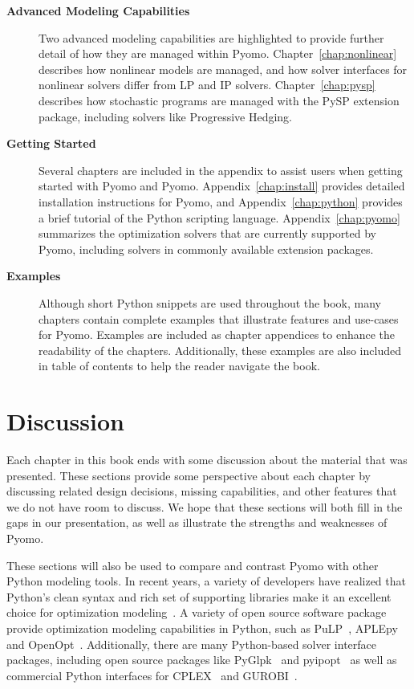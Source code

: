 \begin{description}
\item[{\bf Advanced Modeling Capabilities}] Two advanced modeling
capabilities are highlighted to provide further detail of how they
are managed within Pyomo.  Chapter~\ref{chap:nonlinear} describes how
nonlinear models are managed, and how solver interfaces for nonlinear
solvers differ from LP and IP solvers.  Chapter~\ref{chap:pysp} describes
how stochastic programs are managed with the PySP extension package,
including solvers like Progressive Hedging.

\item[{\bf Getting Started}] Several chapters are included in
the appendix to assist users when getting started with Pyomo and
Pyomo. Appendix~\ref{chap:install} provides detailed installation
instructions for Pyomo, and Appendix~\ref{chap:python} provides a brief
tutorial of the Python scripting language.  Appendix~\ref{chap:pyomo}
summarizes the optimization solvers that are currently supported by Pyomo,
including solvers in commonly available extension packages.

\item[{\bf Examples}] Although short Python snippets are used
throughout the book, many chapters contain complete examples that
illustrate features and use-cases for Pyomo.  Examples are included
as chapter appendices to enhance the readability of the chapters.
Additionally, these examples are also included in table of contents to
help the reader navigate the book.

\end{description}

\section{Discussion}
\label{chap:intro:discussion}

Each chapter in this book ends with some discussion about the material
that was presented.  These sections provide some perspective about each
chapter by discussing related design decisions, missing capabilities,
and other features that we do not have room to discuss.  We hope that these
sections will both fill in the gaps in our presentation, as well as
illustrate the strengths and weaknesses of Pyomo.

These sections will also be used to compare and contrast Pyomo with
other Python modeling tools.  In recent years, a variety of developers
have realized that Python's clean syntax and rich set of supporting
libraries make it an excellent choice for optimization modeling~\cite{hartetal11}.
A variety of open source software package provide optimization modeling
capabilities in Python, such as PuLP~\cite{PuLP}, APLEpy~\cite{APLEpy}
and OpenOpt~\cite{OpenOpt}.  Additionally, there are many Python-based
solver interface packages, including open source packages like
PyGlpk~\cite{PyGlpk} and pyipopt~\cite{pyipopt} as well as commercial
Python interfaces for CPLEX~\cite{CPLEX} and GUROBI~\cite{GUROBI}.

